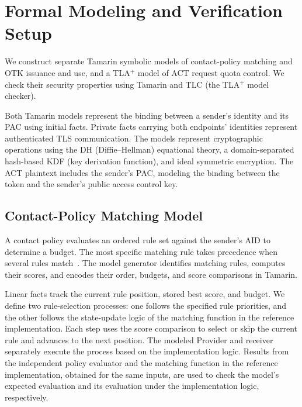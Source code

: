 
\section{Formal Modeling and Verification Setup}
\label{sec:formal-modeling-analysis-setup}

We construct separate Tamarin symbolic models of contact-policy matching and OTK issuance and use, and a TLA$^{+}$ model of ACT request quota control. We check their security properties using Tamarin and TLC (the TLA$^{+}$ model checker).

Both Tamarin models represent the binding between a sender's identity and its PAC using initial facts. Private facts carrying both endpoints' identities represent authenticated TLS communication. The models represent cryptographic operations using the DH (Diffie--Hellman) equational theory, a domain-separated hash-based KDF (key derivation function), and ideal symmetric encryption. The ACT plaintext includes the sender's PAC, modeling the binding between the token and the sender's public access control key.

\subsection{Contact-Policy Matching Model}
\label{subsec:policy-evaluation-model}

A contact policy evaluates an ordered rule set against the sender's AID to determine a budget. The most specific matching rule takes precedence when several rules match~\cite{syros2025sagaV2,sagaReferenceImpl2026}. The model generator identifies matching rules, computes their scores, and encodes their order, budgets, and score comparisons in Tamarin.

Linear facts track the current rule position, stored best score, and budget. We define two rule-selection processes: one follows the specified rule priorities, and the other follows the state-update logic of the matching function in the reference implementation. Each step uses the score comparison to select or skip the current rule and advances to the next position. The modeled Provider and receiver separately execute the process based on the implementation logic. Results from the independent policy evaluator and the matching function in the reference implementation, obtained for the same inputs, are used to check the model's expected evaluation and its evaluation under the implementation logic, respectively.


